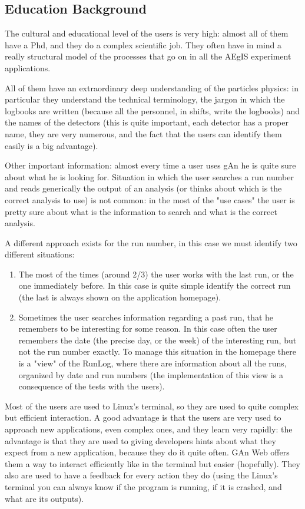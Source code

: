 \subsection{Education Background}
The cultural and educational level of the users is very high: almost all of them have a Phd, and they do a complex scientific job. They often have in mind a really structural model of the processes that go on in all the AEgIS experiment applications.

All of them have an extraordinary deep understanding of the particles physics: in particular they understand the technical terminology, the jargon in which the logbooks are written (because all the personnel, in shifts, write the logbooks) and the names of the detectors (this is quite important, each detector has a proper name, they are very numerous, and the fact that the users can identify them easily is a big advantage). 

Other important information: almost every time a user uses gAn he is quite sure about what he is looking for. Situation in which the user searches a run number and reads generically the output of an analysis (or thinks about which is the correct analysis to use) is not common: in the most of the "use cases" the user is pretty sure about what is the information to search and what is the correct analysis. 

A different approach exists for the run number, in this case we must identify two different situations:

\begin{enumerate}

\item The most of the times (around 2/3) the user works with the last run, or the one immediately before. In this case is quite simple identify the correct run (the last is always shown on the application homepage).
\item Sometimes the user searches information regarding a past run, that he remembers to be interesting for some reason. In this case often the user remembers the date (the precise day, or the week) of the interesting run, but not the run number exactly. To manage this situation in the homepage there is a "view" of the RunLog, where there are information about all the runs, organized by date and run numbers (the implementation of this view is a consequence of the tests with the users). 

\end{enumerate}

Most of the users are used to Linux's terminal, so they are used to quite complex but efficient interaction. A good advantage is that the users are very used to approach new applications, even complex ones, and they learn very rapidly: the advantage is that they are used to giving developers hints about what they expect from a new application, because they do it quite often. GAn Web offers them a way to interact efficiently like in the terminal but easier (hopefully). They also are used to have a feedback for every action they do (using the Linux's terminal you can always know if the program is running, if it is crashed, and what are its outputs).

